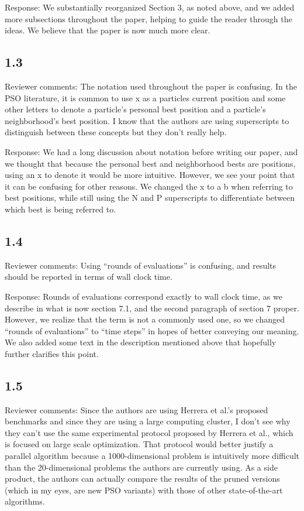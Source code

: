\documentclass[onecolumn, 12pt]{article}
\begin{document}
Response: We substantially reorganized Section 3, as noted above, and we added
more subsections throughout the paper, helping to guide the reader through the
ideas.  We believe that the paper is now much more clear.

\subsection*{1.3}

Reviewer comments: The notation used throughout the paper is confusing. In the
PSO literature, it is common to use x as a particles current position and some
other letters to denote a particle's personal best position and a particle's
neighborhood's best position. I know that the authors are using superscripts to
distinguish between these concepts but they don't really help.

Response: We had a long discussion about notation before writing our paper, and
we thought that because the personal best and neighborhood bests are positions,
using an x to denote it would be more intuitive.  However, we see your point
that it can be confusing for other reasons.  We changed the x to a b when
referring to best positions, while still using the N and P superscripts to
differentiate between which best is being referred to.

\subsection*{1.4}

Reviewer comments: Using ``rounds of evaluations'' is confusing, and results
should be reported in terms of wall clock time.

Response: Rounds of evaluations correspond exactly to wall clock time, as we
describe in what is now section 7.1, and the second paragraph of section 7
proper.  However, we realize that the term is not a commonly used one, so we
changed ``rounds of evaluations'' to ``time steps'' in hopes of better
conveying our meaning.  We also added some text in the description mentioned
above that hopefully further clarifies this point.

\subsection*{1.5}

Reviewer comments: Since the authors are using Herrera et al.'s proposed
benchmarks and since they are using a large computing cluster, I don't see why
they can't use the same experimental protocol proposed by Herrera et al., which
is focused on large scale optimization. That protocol would better justify a
parallel algorithm because a 1000-dimensional problem is intuitively more
difficult than the 20-dimensional problems the authors are currently using. As
a side product, the authors can actually compare the results of the pruned
versions (which in my eyes, are new PSO variants) with those of other
state-of-the-art algorithms.
\end{document}
